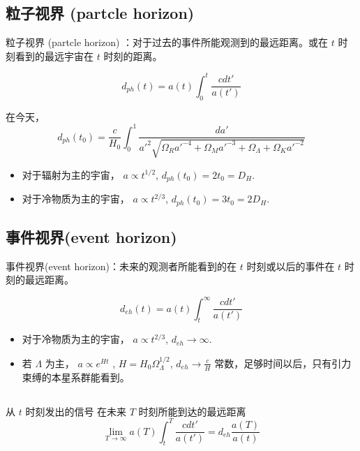 \documentclass[12pt]{ctexart}
\begin{document}
\subsection{粒子视界 (partcle horizon)}
粒子视界 (partcle horizon) ：对于过去的事件所能观测到的最远距离。或在 $t$ 时刻看到的最远宇宙在 $t$ 时刻的距离。

\begin{equation}
    d_{ph}(t) = a(t) \int_0^t \frac{cdt'}{a(t')} 
\end{equation}

在今天，
\begin{equation}
    d_{ph}(t_0) = \frac{c}{H_0}\int_0^1 \frac{da'}{a'^2 \sqrt{\Omega_R a'^{-4}+\Omega_M a'^{-3}+\Omega_\Lambda+\Omega_K a'^{-2}} }
\end{equation}

\begin{itemize}
    \item 对于辐射为主的宇宙， $a\propto t^{1/2}$, $d_{ph}(t_0)=2t_0 = D_H$.
    \item 对于冷物质为主的宇宙， $a\propto t^{2/3}$, $d_{ph}(t_0)=3t_0 = 2 D_H$. 
\end{itemize}

\subsection{事件视界(event horizon)}
事件视界(event horizon)：未来的观测者所能看到的在 $t$ 时刻或以后的事件在 $t$ 时刻的最远距离。

\begin{equation}
    d_{eh}(t) = a(t) \int_t^\infty \frac{cdt'}{a(t')} 
\end{equation}

\begin{itemize}
    \item 对于冷物质为主的宇宙， $a\propto t^{2/3}$, $d_{eh}\to \infty$. 
    \item 若 $\Lambda$ 为主， $a\propto e^{Ht}$ , $H=H_0 \Omega_\Lambda^{1/2}$,  $d_{eh}\to \frac{c}{H}$ 常数，足够时间以后，只有引力束缚的本星系群能看到。 
\end{itemize}

\subsection{}
从  $t$ 时刻发出的信号 在未来 $T$ 时刻所能到达的最远距离
\begin{equation}
    \lim_{T \to \infty}   a(T) \int_t^T \frac{cdt'}{a(t')} = d_{eh} \frac{a(T)}{a(t)}
\end{equation}
\end{document}
